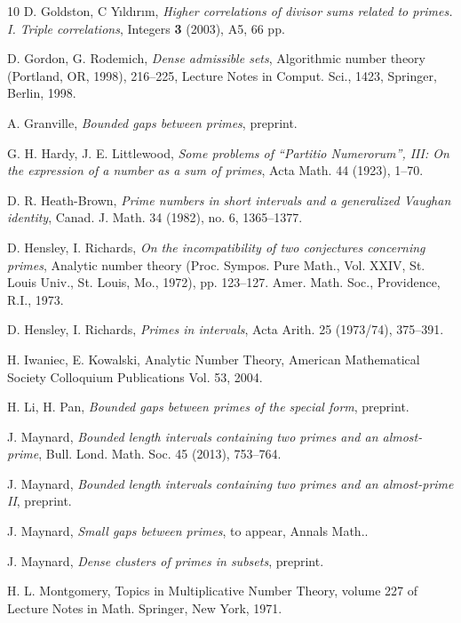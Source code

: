 \documentclass{bmcart}
\theoremstyle{plain}
\theoremstyle{definition}
\begin{document}
\begin{backmatter}
\begin{thebibliography}{10}
D. Goldston, C Y{\i}ld{\i}r{\i}m, \emph{Higher correlations of divisor sums related to primes. I. Triple correlations}, Integers \textbf{3} (2003), A5, 66 pp.

  D. Gordon, G. Rodemich, \emph{Dense admissible
     sets}, Algorithmic number theory (Portland, OR, 1998), 216--225,
   Lecture Notes in Comput. Sci., 1423, Springer, Berlin, 1998.
 
  A. Granville, \emph{Bounded gaps between primes},
   preprint.

  G. H. Hardy, J. E. Littlewood, \emph{Some problems of
     ``Partitio Numerorum'', III: On the expression of a number as a
     sum of primes}, Acta Math. 44 (1923), 1--70.

  D. R. Heath-Brown, \emph{Prime numbers in short
     intervals and a generalized Vaughan identity}, Canad. J. Math. 34
   (1982), no. 6, 1365--1377.

  D. Hensley, I. Richards, \emph{On the
     incompatibility of two conjectures concerning primes}, Analytic
   number theory (Proc. Sympos. Pure Math., Vol. XXIV, St. Louis
   Univ., St. Louis, Mo., 1972), pp. 123--127. Amer. Math. Soc.,
   Providence, R.I., 1973.

  D. Hensley, I. Richards, \emph{Primes in
     intervals}, Acta Arith. 25 (1973/74), 375--391.


  H. Iwaniec, E. Kowalski, Analytic Number Theory,
   American Mathematical Society Colloquium Publications Vol. 53,
   2004.

H. Li, H. Pan, \emph{Bounded gaps between primes of the special form}, preprint.

J. Maynard, \emph{Bounded length intervals containing two primes and an almost-prime}, Bull. Lond. Math. Soc. 45 (2013), 753--764.
  
 J. Maynard, \emph{Bounded length intervals
    containing two primes and an almost-prime II}, preprint.

J. Maynard, \emph{Small gaps between primes}, to appear, Annals Math..
 
J. Maynard, \emph{Dense clusters of primes in subsets}, preprint.

H. L. Montgomery, Topics in Multiplicative Number Theory, volume 227
of Lecture Notes in Math. Springer, New York, 1971.



\end{thebibliography}
\end{backmatter}
\end{document}
